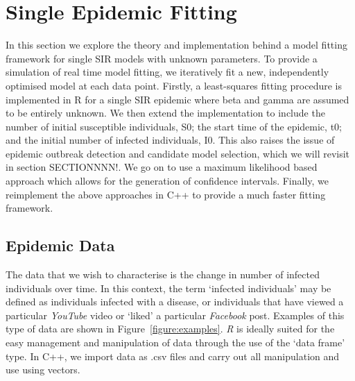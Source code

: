 \chapter{Single Epidemic Fitting}
\label{ch:single}

In this section we explore the theory and implementation behind a
model fitting framework for single SIR models with unknown
parameters. To provide a simulation of real time model fitting, we
iteratively fit a new, independently optimised model at each data point. Firstly, a
least-squares fitting procedure is implemented in R for a single SIR
epidemic where beta and gamma are assumed to be entirely
unknown. We then extend the implementation to include the number of
initial susceptible individuals, S0; the start time
of the epidemic, t0; and the initial number of infected individuals, I0. This also raises
the issue of epidemic outbreak detection and candidate model selection, which we
will revisit in section SECTIONNNN!. We go on to use a maximum
likelihood based approach which allows for the generation of
confidence intervals. Finally, we reimplement the above approaches in
C++ to provide a much faster fitting framework.

\section{Epidemic Data}
The data that we wish to characterise is the change in number of
infected individuals over time. In this context, the term `infected individuals' may be
defined as individuals infected with a disease, or individuals that
have viewed a particular \emph{YouTube} video or `liked' a particular
\emph{Facebook} post. Examples of this type of data are shown in
Figure~\ref{figure:examples}. \emph{R} is ideally suited for the easy management and
manipulation of data through the use of the `data frame' type. In C++,
we import data as .csv files and carry out all manipulation and use
using vectors.


